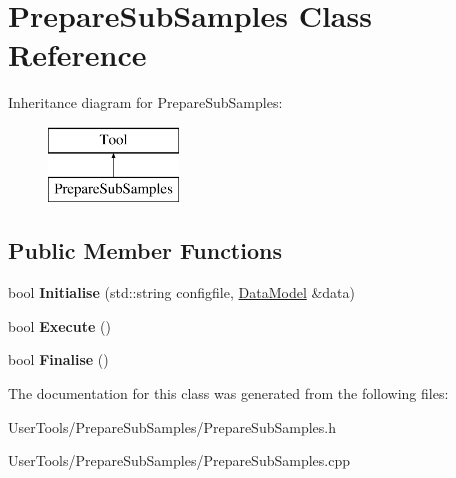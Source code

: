 \hypertarget{classPrepareSubSamples}{\section{Prepare\-Sub\-Samples Class Reference}
\label{classPrepareSubSamples}
}
Inheritance diagram for Prepare\-Sub\-Samples\-:\begin{figure}[H]
\begin{center}
\leavevmode
\includegraphics[height=2.000000cm]{classPrepareSubSamples}
\end{center}
\end{figure}
\subsection*{Public Member Functions}
\begin{DoxyCompactItemize}
\item 
\hypertarget{classPrepareSubSamples_a8d85a66ab8377637756e2fe5580b0578}{bool {\bfseries Initialise} (std\-::string configfile, \hyperlink{classDataModel}{Data\-Model} \&data)}\label{classPrepareSubSamples_a8d85a66ab8377637756e2fe5580b0578}

\item 
\hypertarget{classPrepareSubSamples_a952b1bbc3a74ae7ec0f45b8700e0f918}{bool {\bfseries Execute} ()}\label{classPrepareSubSamples_a952b1bbc3a74ae7ec0f45b8700e0f918}

\item 
\hypertarget{classPrepareSubSamples_ad13127e510e00b6b3898f3e39ca0a4aa}{bool {\bfseries Finalise} ()}\label{classPrepareSubSamples_ad13127e510e00b6b3898f3e39ca0a4aa}

\end{DoxyCompactItemize}


The documentation for this class was generated from the following files\-:\begin{DoxyCompactItemize}
\item 
User\-Tools/\-Prepare\-Sub\-Samples/Prepare\-Sub\-Samples.\-h\item 
User\-Tools/\-Prepare\-Sub\-Samples/Prepare\-Sub\-Samples.\-cpp\end{DoxyCompactItemize}
